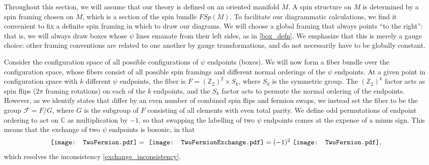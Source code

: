 \documentclass[12pt,a4paper]{article}
\newcommand{\cc}{\mathbb{C}}
\newcommand{\zt}{\mathbb{Z}_2}
\newcommand{\mcf}{\mathcal{F}}
\newcommand{\TwoFermion}{\mathord{\vcenter{\hbox{\texttt{[image: TwoFermion.pdf]}}}}}
\newcommand{\TwoFermionExchange}{\mathord{\vcenter{\hbox{\texttt{[image: TwoFermionExchange.pdf]}}}}}
\begin{document}
Throughout this section, we will assume that our theory is defined on an oriented manifold $M$. 
A spin structure on $M$ is determined by a spin framing chosen on $M$, which is a section of the spin bundle $FSp(M)$. 
To facilitate our diagrammatic calculations, we find it convenient to fix a definite spin framing in which to draw our diagrams. %
We will choose a global framing that always points ``to the right'': that is, we will always draw boxes whose $\psi$ lines emanate from their left sides, as in \eqref{box_defn}. 
We emphasize that this is merely a gauge choice: other framing conventions are related to one another by gauge transformations, and do not necessarily have to be globally constant. 

Consider the configuration space of all possible configurations of $\psi$ endpoints (boxes). 
We will now form a fiber bundle over the configuration space, whose fibers consist of all possible spin framings and different normal orderings of the $\psi$ endpoints. 
At a given point in configuration space with $k$ different $\psi$ endpoints, the fiber is $F = (\zt)^2\times S_k$, where $S_k$ is the symmetric group. 
The $(\zt)^k$ factor acts as spin flips ($2\pi$ framing rotations) on each of the $k$ endpoints, and the $S_k$ factor acts to permute the normal ordering of the endpoints. 
However, as we identify states that differ by an even number of combined spin flips and fermion swaps, we instead set the fiber to be the group $\mcf = F/G$, where $G$ is the subgroup of $F$ consisting of all elements with even total parity. 
We define odd permutations of endpoint ordering to act on $\cc$ as multiplication by $-1$, so that swapping the labelling of two $\psi$ endpoints comes at the expense of a minus sign. 
This means that the exchange of two $\psi$ endpoints is bosonic, in that 
\begin{align} \label{boxbraid}
\TwoFermion =\ \TwoFermionExchange = (-1)^2\ \TwoFermion,
\end{align}
which resolves the inconsistency \eqref{exchange_inconsistency}. 
\end{document}
